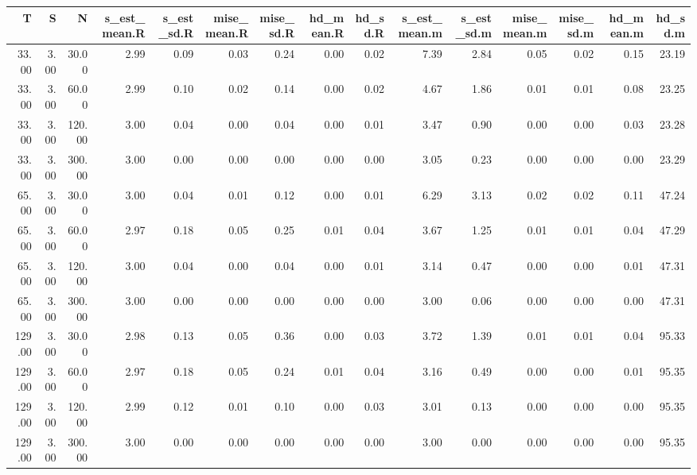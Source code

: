 \begin{table}[ht]
\centering
\begin{tabular}{rrrrrrrrrrrrrrr}
  \hline
T & S & N & s\_est\_mean.R & s\_est\_sd.R & mise\_mean.R & mise\_sd.R & hd\_mean.R & hd\_sd.R & s\_est\_mean.m & s\_est\_sd.m & mise\_mean.m & mise\_sd.m & hd\_mean.m & hd\_sd.m \\ 
  \hline
33.00 & 3.00 & 30.00 & 2.99 & 0.09 & 0.03 & 0.24 & 0.00 & 0.02 & 7.39 & 2.84 & 0.05 & 0.02 & 0.15 & 23.19 \\ 
  33.00 & 3.00 & 60.00 & 2.99 & 0.10 & 0.02 & 0.14 & 0.00 & 0.02 & 4.67 & 1.86 & 0.01 & 0.01 & 0.08 & 23.25 \\ 
  33.00 & 3.00 & 120.00 & 3.00 & 0.04 & 0.00 & 0.04 & 0.00 & 0.01 & 3.47 & 0.90 & 0.00 & 0.00 & 0.03 & 23.28 \\ 
  33.00 & 3.00 & 300.00 & 3.00 & 0.00 & 0.00 & 0.00 & 0.00 & 0.00 & 3.05 & 0.23 & 0.00 & 0.00 & 0.00 & 23.29 \\ 
  65.00 & 3.00 & 30.00 & 3.00 & 0.04 & 0.01 & 0.12 & 0.00 & 0.01 & 6.29 & 3.13 & 0.02 & 0.02 & 0.11 & 47.24 \\ 
  65.00 & 3.00 & 60.00 & 2.97 & 0.18 & 0.05 & 0.25 & 0.01 & 0.04 & 3.67 & 1.25 & 0.01 & 0.01 & 0.04 & 47.29 \\ 
  65.00 & 3.00 & 120.00 & 3.00 & 0.04 & 0.00 & 0.04 & 0.00 & 0.01 & 3.14 & 0.47 & 0.00 & 0.00 & 0.01 & 47.31 \\ 
  65.00 & 3.00 & 300.00 & 3.00 & 0.00 & 0.00 & 0.00 & 0.00 & 0.00 & 3.00 & 0.06 & 0.00 & 0.00 & 0.00 & 47.31 \\ 
  129.00 & 3.00 & 30.00 & 2.98 & 0.13 & 0.05 & 0.36 & 0.00 & 0.03 & 3.72 & 1.39 & 0.01 & 0.01 & 0.04 & 95.33 \\ 
  129.00 & 3.00 & 60.00 & 2.97 & 0.18 & 0.05 & 0.24 & 0.01 & 0.04 & 3.16 & 0.49 & 0.00 & 0.00 & 0.01 & 95.35 \\ 
  129.00 & 3.00 & 120.00 & 2.99 & 0.12 & 0.01 & 0.10 & 0.00 & 0.03 & 3.01 & 0.13 & 0.00 & 0.00 & 0.00 & 95.35 \\ 
  129.00 & 3.00 & 300.00 & 3.00 & 0.00 & 0.00 & 0.00 & 0.00 & 0.00 & 3.00 & 0.00 & 0.00 & 0.00 & 0.00 & 95.35 \\ 
   \hline
\end{tabular}
\end{table}
